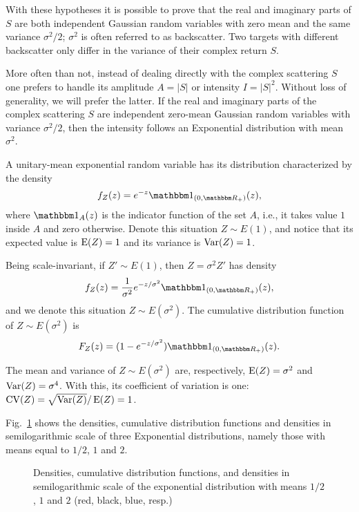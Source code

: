 With these hypotheses it is possible to prove that the real and imaginary parts of $S$ are both independent Gaussian random variables with zero mean and the same variance $\sigma^2/2$; $\sigma^2$ is often referred to as backscatter.
Two targets with different backscatter only differ in the variance of their complex return $S$.

More often than not, instead of dealing directly with the complex scattering $S$ one prefers to handle its amplitude $A=|S|$ or intensity $I=|S|^2$.
Without loss of generality, we will prefer the latter.
If the real and imaginary parts of the complex scattering $S$ are independent zero-mean Gaussian random variables with variance $\sigma^2/2$, then the intensity follows an Exponential distribution with mean $\sigma^2$.

A unitary-mean exponential random variable has its distribution characterized by the density
\begin{equation}
f_Z(z) = e^{-z} \mathbbm 1_{(0,\mathbbm R_+)}(z),
\end{equation}
where $\mathbbm 1_{A}(z)$ is the indicator function of the set $A$, i.e., it takes value $1$ inside $A$ and zero otherwise.
Denote this situation $Z\sim E(1)$, and notice that its expected value is $\operatorname{E}(Z)=1$ and its variance is $\operatorname{Var}(Z)=1$.

Being scale-invariant, if $Z'\sim E(1)$, then $Z=\sigma^2 Z'$ has density
\begin{equation}
f_Z(z) = \frac{1}{\sigma^2}e^{-z/\sigma^2} \mathbbm 1_{(0,\mathbbm R_+)}(z),
\end{equation}
and we denote this situation $Z\sim E(\sigma^2)$.
The cumulative distribution function of $Z\sim E(\sigma^2)$ is 
\begin{equation}
F_Z(z) = (1-e^{-z/\sigma^2}) \mathbbm 1_{(0,\mathbbm R_+)}(z).
\end{equation}

The mean and variance of $Z\sim E(\sigma^2)$ are, respectively, $\operatorname{E}(Z)=\sigma^2$ and $\operatorname{Var}(Z) = \sigma^4$.
With this, its coefficient of variation is one: $\operatorname{CV}(Z) = \sqrt{\operatorname{Var}(Z)}/\operatorname{E}(Z) = 1$.

Fig.~\ref{Fig:ExponentialDistribution} shows the densities, cumulative distribution functions and densities in semilogarithmic scale of three Exponential distributions, namely those with means equal to $1/2$, $1$ and $2$.

\begin{figure}[hbt]
\centering
{}
\caption{Densities, cumulative distribution functions, and densities in semilogarithmic scale of the exponential distribution with means $1/2$, $1$ and $2$ (red, black, blue, resp.)}\label{Fig:ExponentialDistribution}
\end{figure}

